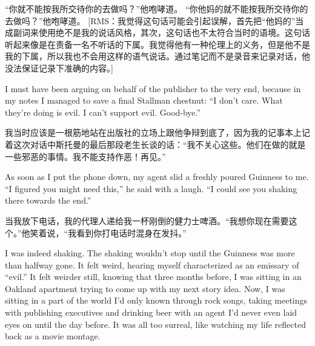 \ifdefined\chs
\ifdefined\nov
``你就不能按我所交待你的去做吗？''他咆哮道。
\fi
\ifdefined\spv
``你他妈的就不能按我所交待你的去做吗？''他咆哮道。
\fi
\ifdefined\vtwo
[RMS：我觉得这句话可能会引起误解，首先把``他妈的''当成副词来使用绝不是我的说话风格，其次，这句话也不太符合当时的语境。这句话听起来像是在责备一名不听话的下属。我觉得他有一种伦理上的义务，但是他不是我的下属，所以我也不会用这样的语气说话。通过笔记而不是录音来记录对话，他没法保证记录下准确的内容。]
\fi
\fi

\ifdefined\eng
I must have been arguing on behalf of the publisher to the very end, because in my notes I managed to save a final Stallman chestnut: ``I don't care. What they're doing is evil. I can't support evil. Good-bye.''  \ifdefined{}\fi
\fi

\ifdefined\chs
我当时应该是一根筋地站在出版社的立场上跟他争辩到底了，因为我的记事本上记着这次对话中斯托曼的最后那段老生长谈的话：``我不关心这些。他们在做的就是一些邪恶的事情。我不能支持作恶！再见。''
\ifdefined{}
\fi
\fi

\ifdefined\eng
As soon as I put the phone down, my agent slid a freshly poured Guinness to me. ``I figured you might need this,'' he said with a laugh. ``I could see you shaking there towards the end.''
\fi

\ifdefined\chs
当我放下电话，我的代理人递给我一杯刚倒的健力士啤酒。``我想你现在需要这个。''他笑着说，``我看到你打电话时混身在发抖。''
\fi

\ifdefined\eng
I was indeed shaking. The shaking wouldn't stop until the Guinness was more than halfway gone. It felt weird, hearing myself characterized as an emissary of ``evil.''
\ifdefined{} \fi
It felt weirder still, knowing that three months before, I was sitting in an Oakland apartment trying to come up with my next story idea. Now, I was sitting in a part of the world I'd only known through rock songs, taking meetings with publishing executives and drinking beer with an agent I'd never even laid eyes on until the day before. It was all too surreal, like watching my life reflected back as a movie montage.
\fi

